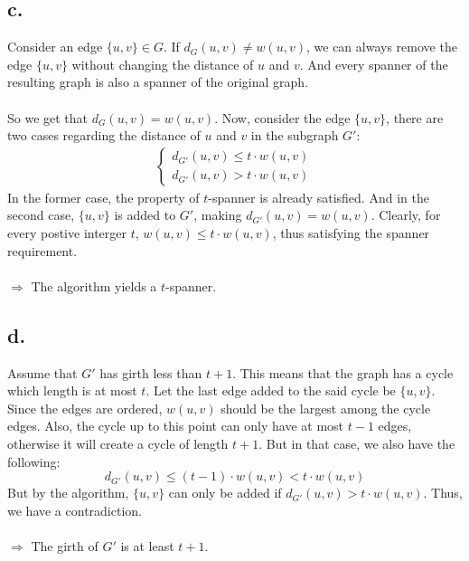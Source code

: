 \documentclass{article}
\begin{document}
\pagebreak
\subsection*{c.}
Consider an edge $\{u, v\} \in G$. If $d_{G}(u, v) \neq w(u, v)$, we can always remove the edge $\{u, v\}$ without changing the distance of $u$ and $v$. And every spanner of the resulting graph is also a spanner of the original graph. \\\\
So we get that $d_{G}(u, v) = w(u, v)$. Now, consider the edge $\{u, v\}$, there are two cases regarding the distance of $u$ and $v$ in the subgraph $G'$: 
\begin{align}
        \begin{cases}
            d_{G'}(u, v) \leq t \cdot w(u, v) \\
            d_{G'}(u, v) > t \cdot w(u, v)
        \end{cases}
        \nonumber
\end{align} 
In the former case, the property of $t$-spanner is already satisfied. And in the second case, $\{u, v\}$ is added to $G'$, making $d_{G'}(u, v) = w(u, v)$. Clearly, for every postive interger $t$, $w(u, v) \leq t \cdot w(u, v)$, thus satisfying the spanner requirement. \\\\
$\Rightarrow$ The algorithm yields a $t$-spanner.

\pagebreak
\subsection*{d.}
Assume that $G'$ has girth less than $t+1$. This means that the graph has a cycle which length is at most $t$. Let the last edge added to the said cycle be $\{u, v\}$. Since the edges are ordered, $w(u, v)$ should be the largest among the cycle edges. Also, the cycle up to this point can only have at most $t - 1$ edges, otherwise it will create a cycle of length $t+1$. But in that case, we also have the following:
\[
d_{G'}(u, v) \leq (t-1) \cdot w(u, v) < t \cdot w(u, v)
\]
But by the algorithm, $\{u, v\}$ can only be added if $d_{G'}(u, v) > t \cdot w(u, v)$. Thus, we have a contradiction. \\\\
$\Rightarrow$ The girth of $G'$ is at least $t+1$.
\end{document}
